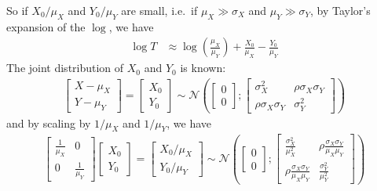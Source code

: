 \documentclass[../../Main_ManuscritThese.tex]{subfiles}
\begin{document}
  So if $X_0 / \mu_X$ and $Y_0/ \mu_Y$ are small, i.e.\ if $\mu_X \gg \sigma_X$ and $\mu_Y \gg \sigma_Y$, by Taylor's expansion of the $\log$, we have
  \begin{align}
    \log T & \approx \log\left(\frac{\mu_X}{\mu_Y}\right) + \frac{X_0}{\mu_X} - \frac{Y_0}{\mu_Y}
  \end{align}
  The joint distribution of $X_0$ and $Y_0$ is known:
  \begin{align}
    \begin{bmatrix}
      X - \mu_X \\ Y - \mu_Y
    \end{bmatrix} = 
    \begin{bmatrix}
      X_0 \\ Y_0
    \end{bmatrix} \sim \mathcal{N}\left(%
    \begin{bmatrix}
      0 \\ 0
    \end{bmatrix};%
    \begin{bmatrix}
      \sigma^2_X  & \rho \sigma_X \sigma_Y \\
      \rho\sigma_X \sigma_Y & \sigma^2_Y
    \end{bmatrix} \right)%
  \end{align}
  and by scaling by $1/\mu_X$ and $1/\mu_Y$, we have
  \begin{align}
    \begin{bmatrix}
      \frac{1}{\mu_X} & 0 \\
      0 & \frac{1}{\mu_Y}
    \end{bmatrix}
    \begin{bmatrix}
      X_0 \\ Y_0
    \end{bmatrix}=
    \begin{bmatrix}
      X_0/\mu_X \\ Y_0/ \mu_Y
    \end{bmatrix} \sim \mathcal{N}\left(%
    \begin{bmatrix}
      0 \\ 0
    \end{bmatrix};%
    \begin{bmatrix}
      \frac{\sigma^2_X}{\mu_X^2}  & \rho \frac{\sigma_X \sigma_Y}{\mu_X \mu_Y} \\
      \rho \frac{\sigma_X \sigma_Y}{\mu_X \mu_Y}& \frac{\sigma^2_Y}{\mu_Y^2}
    \end{bmatrix} \right)%
  \end{align}
\end{document}
